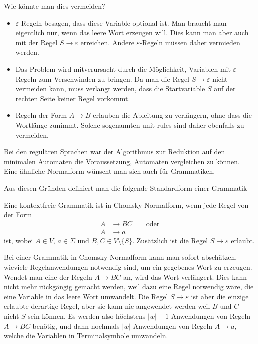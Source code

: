 Wie könnte man dies vermeiden? 
\begin{itemize}
\item
$\varepsilon$-Regeln besagen, dass diese Variable optional ist.
Man braucht man eigentlich nur, wenn das leere Wort erzeugen will.
Dies kann man aber auch mit der Regel $S\to\varepsilon$ erreichen.
Andere $\varepsilon$-Regeln müssen daher vermieden werden.
\item
Das Problem wird mitverursacht durch die Möglichkeit, Variablen mit 
$\varepsilon$-Regeln zum Verschwinden zu bringen.
Da man die Regel $S\to\varepsilon$ nicht vermeiden kann, muss verlangt
werden, dass die Startvariable $S$ auf der rechten Seite keiner Regel
vorkommt.
\item
Regeln der Form $A\to B$ erlauben die Ableitung zu verlängern, ohne
dass die Wortlänge zunimmt.
Solche sogenannten unit rules sind daher ebenfalls zu vermeiden.
\end{itemize}

Bei den regulären Sprachen war der Algorithmus zur Reduktion
auf den minimalen Automaten die Voraussetzung, Automaten vergleichen
zu können. Eine ähnliche Normalform wünscht man sich auch für
Grammatiken.

Aus diesen Gründen definiert man die folgende Standardform einer Grammatik
\begin{definition}
\label{definition:cnf}
%
Eine kontextfreie Grammatik  ist in Chomsky Normalform, wenn
jede Regel von der Form
\begin{align*}
A&\to BC\qquad\text{oder}\\
A&\to a
\end{align*}
ist, wobei $A\in V$, $a\in\Sigma$ und $B, C\in V\setminus\{S\}$.
Zusätzlich ist die Regel $S\to\varepsilon$ erlaubt. 
\end{definition}

Bei einer Grammatik in Chomsky Normalform kann man sofort abschätzen,
wieviele Regelanwendungen notwendig sind, um ein gegebenes Wort
zu erzeugen. Wendet man eine der Regeln $A\to BC$ an, wird das
Wort verlängert. Dies kann nicht mehr rückgängig gemacht
werden, weil dazu eine Regel notwendig wäre, die eine Variable
in das leere Wort umwandelt. Die Regel $S\to\varepsilon$ ist aber
die einzige erlaubte derartige Regel, aber sie kann nie angewendet
werden weil $B$ und $C$ nicht $S$ sein können. Es werden also
höchstens $|w|-1$ Anwendungen von Regeln $A\to BC$ benötig, und dann
nochmals $|w|$ Anwendungen von Regeln $A\to a$, welche die Variablen
in Terminalsymbole umwandeln. 

